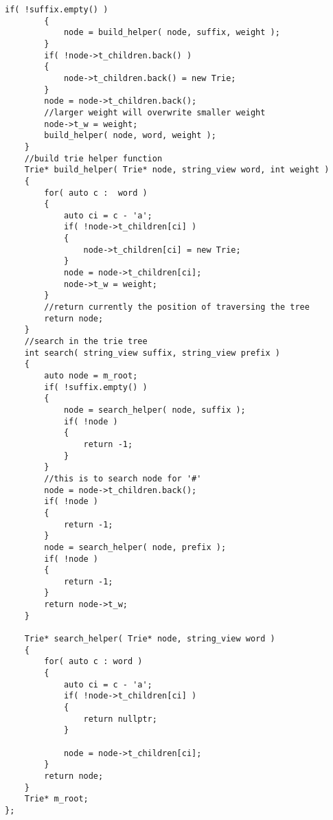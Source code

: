 \begin{lstlisting}[style=customc, caption={Suffix Wrapped Words Trie}]
        if( !suffix.empty() )
        {
            node = build_helper( node, suffix, weight );
        }
        if( !node->t_children.back() )
        {
            node->t_children.back() = new Trie;
        }
        node = node->t_children.back();
		//larger weight will overwrite smaller weight
        node->t_w = weight;
        build_helper( node, word, weight );
    }
	//build trie helper function
    Trie* build_helper( Trie* node, string_view word, int weight )
    {
        for( auto c :  word )
        {
            auto ci = c - 'a';
            if( !node->t_children[ci] )
            {
                node->t_children[ci] = new Trie;
            }
            node = node->t_children[ci];
            node->t_w = weight;
        }
		//return currently the position of traversing the tree
        return node;
    }
	//search in the trie tree
    int search( string_view suffix, string_view prefix )
    {
        auto node = m_root;
        if( !suffix.empty() )
        {
            node = search_helper( node, suffix );
            if( !node )
            {
                return -1;
            }
        }
		//this is to search node for '#'
        node = node->t_children.back();
        if( !node )
        {
            return -1;
        }
        node = search_helper( node, prefix );
        if( !node )
        {
            return -1;
        }
        return node->t_w;
    }

    Trie* search_helper( Trie* node, string_view word )
    {
        for( auto c : word )
        {
            auto ci = c - 'a';
            if( !node->t_children[ci] )
            {
                return nullptr;
            }

            node = node->t_children[ci];
        }
        return node;
    }
    Trie* m_root;
};
\end{lstlisting}